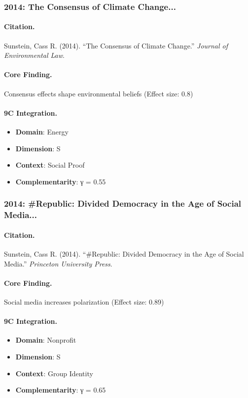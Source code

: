 \subsubsection{2014: The Consensus of Climate Change...}

\paragraph{Citation.}
Sunstein, Cass R. (2014). ``The Consensus of Climate Change.''
\textit{Journal of Environmental Law}.

\paragraph{Core Finding.}
Consensus effects shape environmental beliefs (Effect size: 0.8)

\paragraph{9C Integration.}
\begin{itemize}[nosep]
  \item \textbf{Domain}: Energy
  \item \textbf{Dimension}: S
  \item \textbf{Context}: Social Proof
  \item \textbf{Complementarity}: γ = 0.55
\end{itemize}

\subsubsection{2014: #Republic: Divided Democracy in the Age of Social Media...}

\paragraph{Citation.}
Sunstein, Cass R. (2014). ``#Republic: Divided Democracy in the Age of Social Media.''
\textit{Princeton University Press}.

\paragraph{Core Finding.}
Social media increases polarization (Effect size: 0.89)

\paragraph{9C Integration.}
\begin{itemize}[nosep]
  \item \textbf{Domain}: Nonprofit
  \item \textbf{Dimension}: S
  \item \textbf{Context}: Group Identity
  \item \textbf{Complementarity}: γ = 0.65
\end{itemize}

